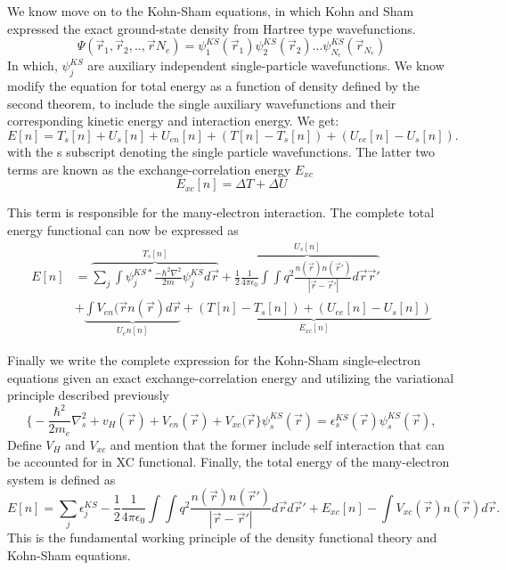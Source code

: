 We know move on to the Kohn-Sham equations, in which Kohn and Sham expressed the exact ground-state density from Hartree type wavefunctions. 
\begin{equation}
    \Psi(\vec{r}_1, \vec{r}_2 , .., \vec{r}{N_e}) = \psi_1^{KS}(\vec{r}_1)\psi_2^{KS}(\vec{r}_2)...\psi_{N_e}^{KS}(\vec{r}_{N_e})
\end{equation}
In which, $\psi_j^{KS}$ are auxiliary independent single-particle wavefunctions. We know modify the equation for total energy as a function of density defined by the second theorem, to include the single auxiliary wavefunctions and their corresponding kinetic energy and interaction energy. We get:
\begin{equation}
    E[n] = T_s[n] + U_s[n] + U_{en}[n] + (T[n] - T_s[n]) + (U_{ee}[n] - U_s[n]).
\end{equation}
with the s subscript denoting the single particle wavefunctions. The latter two terms are known as the exchange-correlation energy $E_{xc}$
\begin{equation}
    E_{xc}[n] = \Delta T + \Delta U
\end{equation}

This term is responsible for the many-electron interaction. The complete total energy functional can now be expressed as
\begin{equation}
    \begin{split}
    E[n] &= \overbrace{\sum_j \int \psi_j^{KS*}\frac{-\hbar^2 \nabla^2}{2m}\psi_j^{KS}d\vec{r}}^{T_s[n]} + \overbrace{\frac{1}{2}\frac{1}{4\pi \epsilon_0} \int \int q^2 \frac{n(\vec{r})n(\vec{r}')}{|\vec{r} - \vec{r}'|}d\vec{r}\vec{r}'}^{U_s[n]} \\ 
        &+ \underbrace{\int V_{en}(\vec{r}n(\vec{r})d\vec{r}}_{U_en[n]} + \underbrace{(T[n] - T_s[n]) + (U_{ee}[n] - U_s[n])}_{E_{xc}[n]}
    \end{split}
\end{equation}

Finally we write the complete expression for the Kohn-Sham single-electron equations given an exact exchange-correlation energy and utilizing the variational principle described previously
\begin{equation}
    \bigg\{ -\frac{\hbar^2}{2m_e}\nabla^2_s + v_H(\vec{r}) + V_{en}(\vec{r}) + V_{xc}(\vec{r} \bigg\}\psi_s^{KS}(\vec{r}) = \epsilon_s^{KS}(\vec{r})\psi_s^{KS}(\vec{r}),
\end{equation}
Define $V_H$ and $V_{xc}$ and mention that the former include self interaction that can be accounted for in XC functional. Finally, the total energy of the many-electron system is defined as
\begin{equation}
    E[n] = \sum_j \epsilon_j^{KS} - \frac{1}{2}\frac{1}{4\pi\epsilon_0} \int \int q^2 \frac{n(\vec{r})n(\vec{r}')}{|\vec{r} - \vec{r}'|}d\vec{r}d\vec{r}' + E_{xc}[n] - \int V_{xc}(\vec{r})n(\vec{r})d\vec{r}.
\end{equation}
This is the fundamental working principle of the density functional theory and Kohn-Sham equations.


